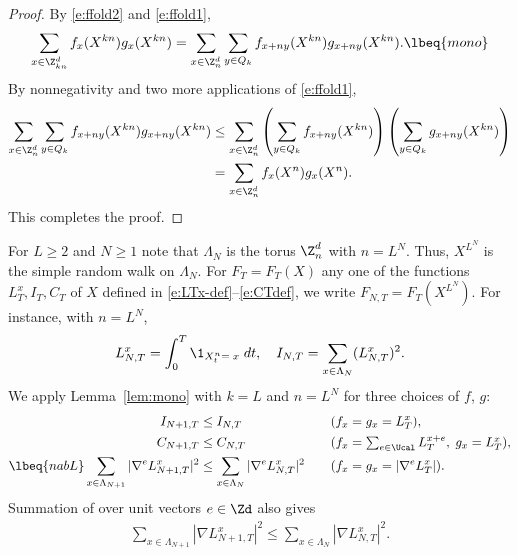 \begin{proof}
By \eqref{e:ffold2} and \eqref{e:ffold1},
\begin{equation}
\sum_{x\in\Z_{kn}^d} f_x(X^{kn}) g_x(X^{kn})
  =
\sum_{x\in\Z_n^d}
\sum_{y \in Q_k}
  f_{x+ny}(X^{kn}) g_{x+ny}(X^{kn}).
\lbeq{mono}
\end{equation}
By nonnegativity and two more applications of \eqref{e:ffold1},
\begin{align}
\sum_{x\in\Z_n^d}
\sum_{y \in Q_k}
f_{x+ny}(X^{kn}) g_{x+ny}(X^{kn})
  &\le \sum_{x\in\Z_n^d}
      \left(\sum_{y \in Q_k} f_{x+ny}(X^{kn})\right)
      \left(\sum_{y \in Q_k} g_{x+ny}(X^{kn})\right) \nonumber \\
  &= \sum_{x\in\Z_n^d} f_x(X^n) g_x(X^n).
\end{align}
This completes the proof.
\end{proof}

For $L \geq 2$ and $N \geq 1$
note that $\Lambda_N$ is the torus $\Z^d_n$ with $n=L^N$.
Thus, $X^{L^N}$ is the simple random walk on $\Lambda_N$.
For $F_T = F_T(X)$ any one of the functions $L_T^x,I_T,C_T$
of $X$ defined in \eqref{e:LTx-def}--\eqref{e:CTdef},
we write $F_{N,T} = F_T(X^{L^N})$. For instance, with $n=L^N$,
\begin{equation}
    L^x_{N,T} = \int_0^T \1_{X^{n}_t=\;x} \; dt,
    \quad I_{N,T} = \sum_{x \in \Lambda_N}(L_{N,T}^x)^2 .
\end{equation}
We apply Lemma~\ref{lem:mono} with $k = L$ and $n = L^N$ for three
choices of $f$, $g$:
\begin{alignat}{2}
\label{e:ILT-mon}
I_{N+1,T} &\leq I_{N,T}
	\quad
&&(f_x=g_x=L_T^x),
	\\
\label{e:CSA-mon}
C_{N+1,T} &\leq C_{N,T}
	\quad
&&(f_x=\textstyle{\sum_{e\in \Ucal}L_T^{x+e}},\; g_x=L_T^x),
	\\
\lbeq{nabL}
\sum_{x\in\Lambda_{N+1}} |\nabla^e L^x_{N+1,T}|^2
	&\leq
\sum_{x\in\Lambda_N} |\nabla^e L^x_{N,T}|^2
	\quad
&& (f_x = g_x = \left|\nabla^e L_T^x\right|).
\end{alignat}
Summation of  over unit vectors $e\in\Zd$ also gives
\begin{align}
\label{e:gradLT-mon}
\sum_{x\in\Lambda_{N+1}} |\nabla L^x_{N+1,T}|^2
  \leq
\sum_{x\in\Lambda_N} |\nabla L^x_{N,T}|^2.
\end{align}


